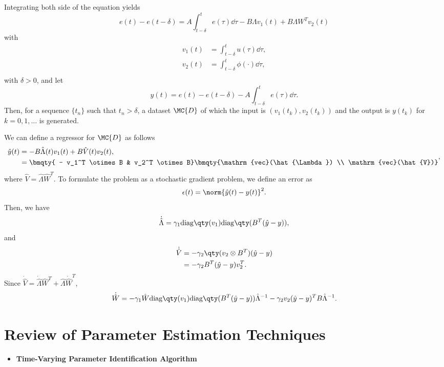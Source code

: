 \documentclass[nobib]{my-handout}
\begin{document}
Integrating both side of the equation yields \[
e(t) - e(t-\delta) = A \int_{t-\delta}^t e(\tau) \dd{\tau} - B \Lambda v_1(t) +
B \Lambda W^T v_2(t)
\] with \[
\begin{aligned}
    v_1(t) &= \int_{t-\delta}^t u(\tau) \dd{\tau}, \\
    v_2(t) &= \int_{t-\delta}^t \phi(\cdot) \dd{\tau}, \\
\end{aligned}
\] with \(\delta > 0\), and let \[
y(t) = e(t) - e(t - \delta) - A \int_{t - \delta}^{t} e(\tau) \dd{\tau}.
\] Then, for a sequence \(\{t_n\}\) such that \(t_n > \delta\), a
dataset \(\MC{D}\) of which the input is \((v_1(t_k), v_2(t_k))\) and
the output is \(y(t_k)\) for \(k=0,1,\dotsc\) is generated.

We can define a regressor for \(\MC{D}\) as follows
\begin{equation}
	\begin{aligned}
		\hat{y}(t) &= - B \hat{\Lambda}(t) v_1(t) + B \hat{V}(t) v_2(t),\\
		&= \bmqty{ - v_1^T \otimes B & v_2^T \otimes B}
		\bmqty{\mathrm{vec}(\hat{\Lambda}) \\ \mathrm{vec}(\hat{V})}
	\end{aligned},
\end{equation}
where \(\hat{V} = \hat{\Lambda} \hat{W}^T\). To formulate the problem
as a stochastic gradient problem, we define an error as \[
\epsilon(t) = \norm{\hat{y}(t) - y(t)}^2.
\] Then, we have \[
\dot{\hat{\Lambda}} = \gamma_1 \mathrm{diag}\qty(v_1) \mathrm{diag}\qty(B^T
(\hat{y} - y)),
\] and \[
\begin{aligned}
    \dot{\hat{V}} &=  - \gamma_2 \qty(v_2 \otimes B^T) (\hat{y} - y) \\
    &= - \gamma_2 B^T (\hat{y} - y) v_2^T.
\end{aligned}
\] Since
\(\dot{\hat{V}} = \dot{\hat{\Lambda}} \hat{W}^T + \hat{\Lambda} \dot{\hat{W}}^T\),
\[
\dot{\hat{W}} = - \gamma_1 \hat{W} \mathrm{diag}\qty(v_1) \mathrm{diag}\qty(B^T
(\hat{y} - y)) \hat{\Lambda}^{-1} - \gamma_2 v_2 (\hat{y} - y)^T B
\hat{\Lambda}^{-1}.
\]

\section{Review of Parameter Estimation Techniques}

\begin{itemize}
	\item
		\textbf{Time-Varying Parameter Identification
		Algorithm}~\cite{rios_time-varying_2017}
\end{itemize}
\end{document}
